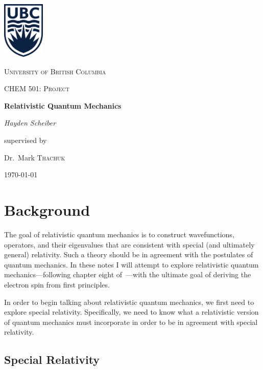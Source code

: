 \documentclass[titlepage,letterpaper,onecolumn,11pt,final]{report}
\numberwithin{equation}{section}
\numberwithin{figure}{section}
\begin{document}
\hypersetup{pageanchor=false}
\begin{titlepage}
	\centering
	\includegraphics[width=0.15\textwidth]{UBC_logo.png}\par
	\vspace{1cm}
	{\scshape\LARGE University of British Columbia \par}
	\vspace{1cm}
	{\scshape\Large CHEM 501: Project\par}
	\vspace{1.5cm}
	{\huge\bfseries Relativistic Quantum Mechanics\par}
	\vspace{2cm}
	{\Large\itshape Hayden Scheiber\par}
	\vfill
	supervised by\par
	Dr.~Mark \textsc{Thachuk}

	\vfill

	{\large \today\par}
\end{titlepage}

\hypersetup{pageanchor=true}

\tableofcontents

\chapter{Background}

The goal of relativistic quantum mechanics is to construct wavefunctions, operators, and their eigenvalues that are consistent with special (and ultimately general) relativity. Such a theory should be in agreement with the postulates of quantum mechanics. In these notes I will attempt to explore relativistic quantum mechanics---following chapter eight of~\cite{b:ModernQM}---with the ultimate goal of deriving the electron spin from first principles.

In order to begin talking about relativistic quantum mechanics, we first need to explore special relativity. Specifically, we need to know what a relativistic version of quantum mechanics must incorporate in order to be in agreement with special relativity.

\section{Special Relativity}
\end{document}
